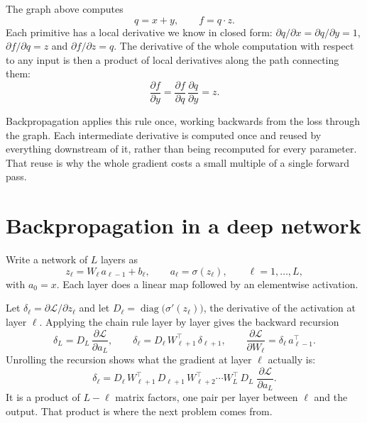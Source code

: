 \documentclass[11pt]{article}
\newcommand{\Loss}{\mathcal{L}}
\begin{document}
\noindent
The graph above computes
%
\[
  q = x + y, \qquad f = q \cdot z .
\]
%
Each primitive has a local derivative we know in closed form:
$\partial q/\partial x = \partial q / \partial y = 1$, $\partial f/\partial q = z$ and
$\partial f/\partial z = q$. The derivative of the whole computation with respect to any
input is then a product of local derivatives along the path connecting them:
%
\[
  \frac{\partial f}{\partial y}
  = \frac{\partial f}{\partial q}\,\frac{\partial q}{\partial y} = z .
\]

\noindent
Backpropagation applies this rule once, working backwards from the loss through the graph.
Each intermediate derivative is computed once and reused by everything downstream of it,
rather than being recomputed for every parameter. That reuse is why the whole gradient
costs a small multiple of a single forward pass.

\section{Backpropagation in a deep network}

Write a network of $L$ layers as
%
\[
  z_\ell = W_\ell\, a_{\ell-1} + b_\ell,
  \qquad
  a_\ell = \sigma(z_\ell),
  \qquad \ell = 1, \ldots, L,
\]
%
with $a_0 = x$. Each layer does a linear map followed by an elementwise activation.

\begin{center}
\end{center}

\noindent
Let $\delta_\ell = \partial\Loss/\partial z_\ell$ and let $D_\ell = \operatorname{diag}
\big(\sigma'(z_\ell)\big)$, the derivative of the activation at layer $\ell$. Applying the
chain rule layer by layer gives the backward recursion
%
\[
  \delta_L = D_L\,\frac{\partial \Loss}{\partial a_L},
  \qquad
  \delta_\ell = D_\ell\, W_{\ell+1}^{\top}\, \delta_{\ell+1},
  \qquad
  \frac{\partial \Loss}{\partial W_\ell} = \delta_\ell\, a_{\ell-1}^{\top}.
\]
%
Unrolling the recursion shows what the gradient at layer $\ell$ actually is:
%
\[
  \delta_\ell
  = D_\ell\, W_{\ell+1}^{\top}\, D_{\ell+1}\, W_{\ell+2}^{\top} \cdots
    W_{L}^{\top}\, D_L \; \frac{\partial \Loss}{\partial a_L}.
\]
%
It is a product of $L - \ell$ matrix factors, one pair per layer between $\ell$ and the
output. That product is where the next problem comes from.
\end{document}
